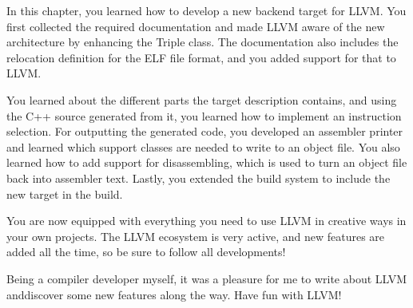 In this chapter, you learned how to develop a new backend target for LLVM. You first collected the required documentation and made LLVM aware of the new architecture by enhancing the Triple class. The documentation also includes the relocation definition for the ELF file format, and you added support for that to LLVM.\par

You learned about the different parts the target description contains, and using the C++ source generated from it, you learned how to implement an instruction selection. For outputting the generated code, you developed an assembler printer and learned which support classes are needed to write to an object file. You also learned how to add support for disassembling, which is used to turn an object file back into assembler text. Lastly, you extended the build system to include the new target in the build.\par

You are now equipped with everything you need to use LLVM in creative ways in your own projects. The LLVM ecosystem is very active, and new features are added all the time, so be sure to follow all developments!\par

Being a compiler developer myself, it was a pleasure for me to write about LLVM anddiscover some new features along the way. Have fun with LLVM!

\newpage